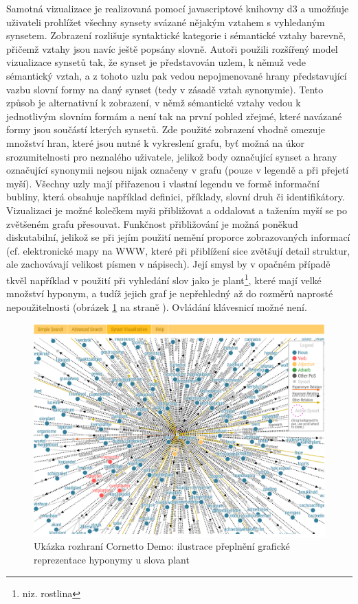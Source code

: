 \documentclass[a4paper, 11pt, oneside]{book}
\newcommand\ex{\textsf}
\begin{document}
				Samotná vizualizace je realizovaná pomocí javascriptové knihovny d3 \parencite{BostockD3} a umožňuje uživateli prohlížet všechny synsety svázané nějakým vztahem s vyhledaným synsetem. Zobrazení rozlišuje syntaktické kategorie i sémantické vztahy barevně, přičemž vztahy jsou navíc ještě popsány slovně. Autoři použili rozšířený model vizualizace synsetů tak, že synset je představován uzlem, k němuž vede sémantický vztah, a z tohoto uzlu pak vedou nepojmenované hrany představující vazbu slovní formy na daný synset (tedy v zásadě vztah synonymie). Tento způsob je alternativní k zobrazení, v němž sémantické vztahy vedou k jednotlivým slovním formám a není tak na první pohled zřejmé, které navázané formy jsou součástí kterých synsetů. Zde použité zobrazení vhodně omezuje množství hran, které jsou nutné k vykreslení grafu, byť možná na úkor srozumitelnosti pro neznalého uživatele, jelikož body označující synset a hrany označující synonymii nejsou nijak označeny v grafu (pouze v legendě a při přejetí myší). Všechny uzly mají přiřazenou i vlastní legendu ve formě informační bubliny, která obsahuje například definici, příklady, slovní druh či identifikátory. Vizualizaci je možné kolečkem myši přibližovat a oddalovat a tažením myší se po zvětšeném grafu přesouvat. Funkčnost přibližování je možná poněkud diskutabilní, jelikož se při jejím použití nemění proporce zobrazovaných informací (cf. elektronické mapy na WWW, které při přiblížení sice zvětšují detail struktur, ale zachovávají velikost písmen v nápisech). Její smysl by v opačném případě tkvěl například v použití při vyhledání slov jako je \ex{plant}\footnote{niz. rostlina}, které mají velké množství hyponym, a tudíž jejich graf je nepřehledný až do rozměrů naprosté nepoužitelnosti (obrázek \ref{fig:wncorplant} na straně \pageref{fig:wncorplant}). Ovládání klávesnicí možné není.

				\begin{figure}[h]
					\centering
					\includegraphics[width=1.0\textwidth]{wncorplant.png}
					\caption{Ukázka rozhraní Cornetto Demo: ilustrace přeplnění grafické reprezentace hyponymy u slova \ex{plant}}
					\label{fig:wncorplant}
				\end{figure}
\end{document}

